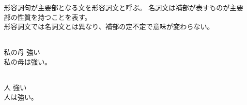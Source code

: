 形容詞句が主要部となる文を形容詞文と呼ぶ。
名詞文は補部が表すものが主要部の性質を持つことを表す。\\
形容詞文では名詞文とは異なり、補部の定不定で意味が変わらない。

\begin{exe}
    \ex \gll [rea r\'ep\'a] [nup\'i] \\
        私の母 強い \\
    \glt 私の母は強い。
\end{exe}
\begin{exe}
    \ex \gll [ap\'a] [nup\'i] \\
        人 強い \\
    \glt 人は強い。
\end{exe}